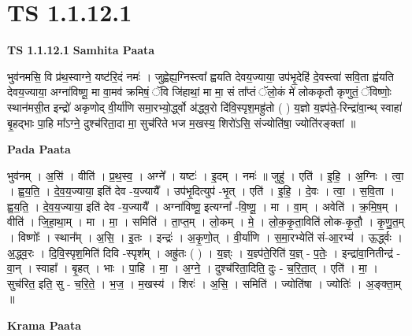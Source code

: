 \documentclass[17pt]{extarticle}
\begin{document}
\section*{ TS 1.1.12.1 }

\textbf{TS 1.1.12.1 } \newline
\textbf{Samhita Paata} \newline

भुव॑नमसि॒ वि प्र॑थ॒स्वाग्ने॒ यष्ट॑रि॒दं नमः॑ । जुह्वेह्य॒ग्निस्त्वा᳚ ह्वयति देवय॒ज्याया॒ उप॑भृ॒देहि॑ दे॒वस्त्वा॑ सवि॒ता ह्व॑यति देवय॒ज्याया॒ अग्ना॑विष्णू॒ मा वा॒मव॑ क्रमिषं॒ ॅवि जि॑हाथां॒ मा मा॒ सं ता᳚प्तं ॅलो॒कं मे॑ लोककृतौ कृणुतं॒ ॅविष्णोः॒ स्थान॑मसी॒त इन्द्रो॑ अकृणोद् वी॒र्या॑णि समा॒रभ्यो॒र्द्ध्वो अ॑द्ध्व॒रो दि॑वि॒स्पृश॒मह्रु॑तो ( ) य॒ज्ञो य॒ज्ञ्प॑ते॒-रिन्द्रा॑वा॒न्थ् स्वाहा॑ बृ॒हद्भाः पा॒हि मा᳚ऽग्ने॒ दुश्च॑रिता॒दा मा॒ सुच॑रिते भज म॒खस्य॒ शिरो॑ऽसि॒ संज्योति॑षा॒ ज्योति॑रङ्क्तां ॥ \newline

\textbf{Pada Paata} \newline

भुव॑नम् । अ॒सि॑ । वीति॑ । प्र॒थ॒स्व॒ । अग्ने᳚ । यष्टः॑ । इ॒दम् । नमः॑ ॥ जुहु॑ । एति॑ । इ॒हि॒ । अ॒ग्निः । त्वा॒ । ह्व॒य॒ति॒ । दे॒व॒य॒ज्याया॒ इति॑ देव -य॒ज्यायै᳚ । उप॑भृ॒दित्युप॑ -भृ॒त् । एति॑ । इ॒हि॒ । दे॒वः । त्वा॒ । स॒वि॒ता । ह्व॒य॒ति॒ । दे॒व॒य॒ज्याया॒ इति॑ देव -य॒ज्यायै᳚ । अग्ना॑विष्णू॒ इत्यग्ना᳚ -वि॒ष्णू॒ । मा । वा॒म् । अवेति॑ । क्र॒मि॒ष॒म् । वीति॑ । जि॒हा॒था॒म् । मा । मा॒ । समिति॑ । ता॒प्त॒म् । लो॒कम् । मे॒ । लो॒क॒कृ॒ता॒विति॑ लोक-कृ॒तौ॒ । कृ॒णु॒त॒म् । विष्णोः᳚ । स्थान᳚म् । अ॒सि॒ । इ॒तः । इन्द्रः॑ । अ॒कृ॒णो॒त् । वी॒र्या॑णि । स॒मा॒रभ्येति॑ सं-आ॒रभ्य॑ । ऊ॒र्द्ध्वः । अ॒द्ध्व॒रः । दि॒वि॒स्पृश॒मिति॑ दिवि -स्पृश᳚म् । अह्रु॑तः ( ) । य॒ज्ञ्ः । य॒ज्ञ्प॑ते॒रिति॑ य॒ज्ञ् - प॒तेः॒ । इन्द्रा॑वा॒नितीन्द्र॑ - वा॒न् । स्वाहा᳚ । बृ॒हत् । भाः । पा॒हि । मा॒ । अ॒ग्ने॒ । दुश्च॑रिता॒दिति॒ दुः - च॒रि॒ता॒त् । एति॑ । मा॒ । सुच॑रित॒ इति॒ सु - च॒रि॒ते॒ । भ॒ज॒ । म॒खस्य॑ । शिरः॑ । अ॒सि॒ । समिति॑ । ज्योति॑षा । ज्योतिः॑ । अ॒ङ्क्ता॒म् ॥  \newline


\textbf{Krama Paata} \newline
\end{document}
